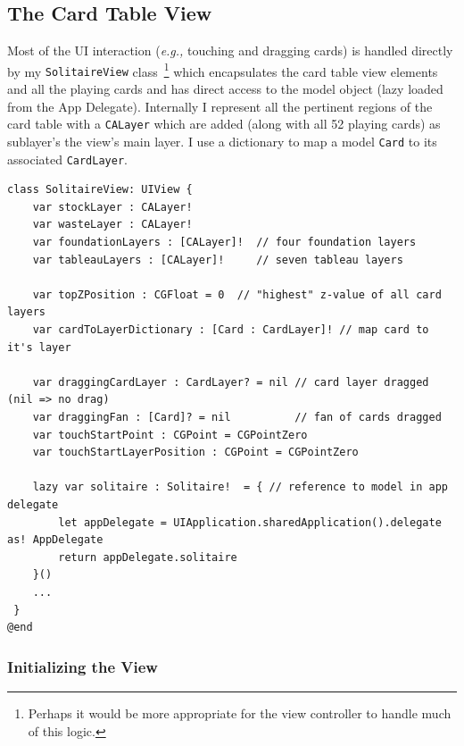 \documentclass[11pt]{article}
\begin{document}
\subsection{The Card Table View}

Most of the UI interaction ({\it e.g.,} touching and dragging cards) 
is handled directly by my {\tt SolitaireView} class~\footnote{Perhaps it would
be more appropriate for the view controller to handle much of this logic.}
which encapsulates
the card table view elements and all the playing cards and has direct
access to the model object (lazy loaded from the App Delegate).
Internally I represent all the pertinent regions of the card
table with a {\tt CALayer} which are added (along with all 52 playing
cards) as sublayer's the view's main layer.
I use a dictionary to map a model {\tt Card} to its associated
{\tt CardLayer}. 
\begin{verbatim}
class SolitaireView: UIView {
    var stockLayer : CALayer!
    var wasteLayer : CALayer!
    var foundationLayers : [CALayer]!  // four foundation layers
    var tableauLayers : [CALayer]!     // seven tableau layers
    
    var topZPosition : CGFloat = 0  // "highest" z-value of all card layers
    var cardToLayerDictionary : [Card : CardLayer]! // map card to it's layer
    
    var draggingCardLayer : CardLayer? = nil // card layer dragged (nil => no drag)
    var draggingFan : [Card]? = nil          // fan of cards dragged
    var touchStartPoint : CGPoint = CGPointZero
    var touchStartLayerPosition : CGPoint = CGPointZero
    
    lazy var solitaire : Solitaire!  = { // reference to model in app delegate
        let appDelegate = UIApplication.sharedApplication().delegate as! AppDelegate
        return appDelegate.solitaire
    }()
    ...
 }
@end
\end{verbatim}

\subsubsection{Initializing the View}
\end{document}
